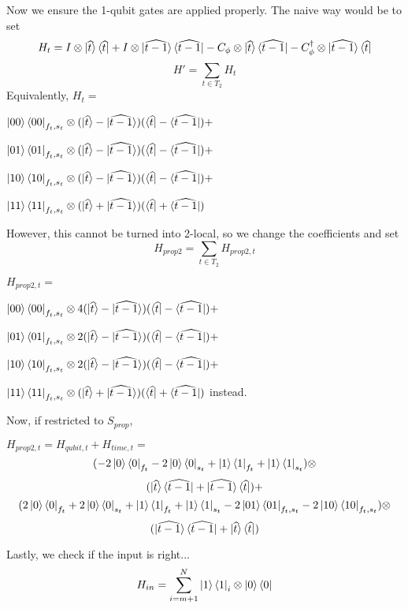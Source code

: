 \documentclass{article}
\theoremstyle{definition}
\begin{document}
Now we ensure the 1-qubit gates are applied properly. The naive way would be to set
	$$H_t=I\otimes\ket{\widehat t}\bra{\widehat t}
		+I\otimes\ket{\widehat{t-1}}\bra{\widehat{t-1}}
		-C_\phi\otimes\ket{\widehat t}\bra{\widehat{t-1}}
		-C_\phi^\dagger\otimes\ket{\widehat{t-1}}\bra{\widehat{t}}$$
	$$H'=\sum_{t\in T_2}H_t$$
	Equivalently, $H_t=$

	$\ket{00}\bra{00}_{f_t,s_t}\otimes
		(\ket{\widehat{t}}-\ket{\widehat{t-1}})
		(\bra{\widehat{t}}-\bra{\widehat{t-1}})+$

	$\ket{01}\bra{01}_{f_t,s_t}\otimes
		(\ket{\widehat{t}}-\ket{\widehat{t-1}})
		(\bra{\widehat{t}}-\bra{\widehat{t-1}})+$

	$\ket{10}\bra{10}_{f_t,s_t}\otimes
		(\ket{\widehat{t}}-\ket{\widehat{t-1}})
		(\bra{\widehat{t}}-\bra{\widehat{t-1}})+$

	$\ket{11}\bra{11}_{f_t,s_t}\otimes
		(\ket{\widehat{t}}+\ket{\widehat{t-1}})
		(\bra{\widehat{t}}+\bra{\widehat{t-1}})$

However, this cannot be turned into 2-local, so we change the coefficients and set 
	$$H_{prop2}=\sum_{t\in T_2}H_{prop2,t}$$

	$H_{prop2,t}=$

	$\ket{00}\bra{00}_{f_t,s_t}\otimes
		4(\ket{\widehat{t}}-\ket{\widehat{t-1}})
		(\bra{\widehat{t}}-\bra{\widehat{t-1}})+$

	$\ket{01}\bra{01}_{f_t,s_t}\otimes
		2(\ket{\widehat{t}}-\ket{\widehat{t-1}})
		(\bra{\widehat{t}}-\bra{\widehat{t-1}})+$

	$\ket{10}\bra{10}_{f_t,s_t}\otimes
		2(\ket{\widehat{t}}-\ket{\widehat{t-1}})
		(\bra{\widehat{t}}-\bra{\widehat{t-1}})+$

	$\ket{11}\bra{11}_{f_t,s_t}\otimes
		(\ket{\widehat{t}}+\ket{\widehat{t-1}})
		(\bra{\widehat{t}}+\bra{\widehat{t-1}})$
instead.

Now, if restricted to $S_{prop}$,

	$H_{prop2,t}=H_{qubit,t}+H_{time,t}=$
	$$(-2\ket{0}\bra{0}_{f_t}-2\ket{0}\bra{0}_{s_t}
		+\ket{1}\bra{1}_{f_t}+\ket{1}\bra{1}_{s_t})\otimes$$
	$$(\ket{\widehat{t}}\bra{\widehat{t-1}}+
		\ket{\widehat{t-1}}\bra{\widehat{t}})+$$
	$$(2\ket{0}\bra{0}_{f_t}+2\ket{0}\bra{0}_{s_t}
		+\ket{1}\bra{1}_{f_t}+\ket{1}\bra{1}_{s_t}
		-2\ket{01}\bra{01}_{f_t,s_t}
		-2\ket{10}\bra{10}_{f_t,s_t})\otimes$$
	$$(\ket{\widehat{t-1}}\bra{\widehat{t-1}}+
		\ket{\widehat{t}}\bra{\widehat{t}})$$


Lastly, we check if the input is right...
	$$H_{in}=\sum_{i=m+1}^N\ket{1}\bra{1}_i\otimes\ket{0}\bra{0}$$
\end{document}
